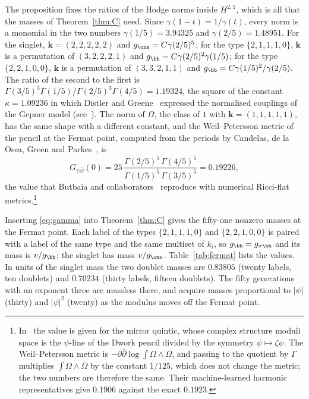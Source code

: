 The proposition fixes the ratios of the Hodge norms inside $H^{2,1}$, which
is all that the masses of Theorem~\ref{thm:C} need. Since $\gamma(1-t)=
1/\gamma(t)$, every norm is a monomial in the two numbers
$\gamma(1/5)=3.94325$ and $\gamma(2/5)=1.48951$. For the singlet,
$\mathbf k=(2,2,2,2,2)$ and $g_{\one}=C\gamma(2/5)^5$; for the type
$\{2,1,1,1,0\}$, $\mathbf k$ is a permutation of $(3,2,2,2,1)$ and
$g_{\bb}=C\gamma(2/5)^2\gamma(1/5)$; for the type $\{2,2,1,0,0\}$,
$\mathbf k$ is a permutation of $(3,3,2,1,1)$ and $g_{\bb}=C\gamma(1/5)^2/
\gamma(2/5)$. The ratio of the second to the first is
$\Gamma(3/5)^3\Gamma(1/5)/\Gamma(2/5)^3\Gamma(4/5)=1.19324$, the square of
the constant $\kappa=1.09236$ in which Distler and Greene~\cite{DG88}
expressed the normalised couplings of the Gepner model
(see~\cite[eq.~(4.3)]{BMT24}). The norm of $\Omega$, the class of $1$ with
$\mathbf k=(1,1,1,1,1)$, has the same shape with a different constant, and
the Weil--Petersson metric of the pencil at the Fermat point, computed from
the periods by Candelas, de la Ossa, Green and Parkes~\cite{CDGP91}, is
\[
G_{\psi\bar\psi}(0)=25\,\frac{\Gamma(2/5)^5\,\Gamma(4/5)^5}
{\Gamma(1/5)^5\,\Gamma(3/5)^5}=0.19226,
\]
the value that Butbaia and collaborators~\cite{BMT24} reproduce with
numerical Ricci-flat metrics.\footnote{In~\cite{BMT24} the value is given
for the mirror quintic, whose complex structure moduli space is the
$\psi$-line of the Dwork pencil divided by the symmetry
$\psi\mapsto\zeta\psi$. The Weil--Petersson metric is
$-\partial\bar\partial\log\int\Omega\wedge\overline\Omega$, and passing to
the quotient by $\Gamma$ multiplies $\int\Omega\wedge\overline\Omega$ by the
constant $1/125$, which does not change the metric; the two numbers are
therefore the same. Their machine-learned harmonic representatives give
$0.1906$ against the exact $0.1923$.}

Inserting \eqref{eq:gamma} into Theorem~\ref{thm:C} gives the fifty-one
nonzero masses at the Fermat point. Each label of the types
$\{2,1,1,1,0\}$ and $\{2,2,1,0,0\}$ is paired with a label of the same type
and the same multiset of $k_i$, so $g_{\bb}=g_{\sigma\bb}$ and its mass is
$v/g_{\bb}$; the singlet has mass $v/g_{\one}$. Table~\ref{tab:fermat} lists
the values. In units of the singlet mass the two doublet masses are
$0.83805$ (twenty labels, ten doublets) and $0.70234$ (thirty labels,
fifteen doublets). The fifty generations with an exponent three are
massless there, and acquire masses proportional to $|\psi|$ (thirty) and
$|\psi|^2$ (twenty) as the modulus moves off the Fermat point.

